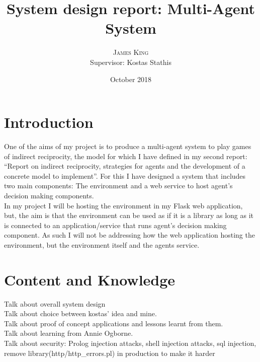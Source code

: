 \documentclass[twoside,twocolumn]{article}
\title{System design report: Multi-Agent System} %
\author{%
\textsc{James King} \\%
\normalsize Supervisor: Kostas Stathis \\ %
}
\date{October 2018} %
\begin{document}

\maketitle


\section{Introduction}
One of the aims of my project is to produce a multi-agent system to play games of indirect reciprocity, the model for which I have defined in my second report: ``Report on indirect reciprocity, strategies for agents and the development of a concrete model to implement''. For this I have designed a system that includes two main components: The environment and a web service to host agent's decision making components.\\
In my project I will be hosting the environment in my Flask web application, but, the aim is that the environment can be used as if it is a library as long as it is connected to an application/service that runs agent's decision making component. As such I will not be addressing how the web application hosting the environment, but the environment itself and the agents service.


\section{Content and Knowledge}
Talk about overall system design\\
Talk about choice between kostas' idea and mine.\\
Talk about proof of concept applications and lessons learnt from them.\\
Talk about learning from Annie Ogborne.\\
Talk about security: Prolog injection attacks, shell injection attacks, sql injection, remove library(http/http\_errors.pl) in production to make it harder
\end{document}
